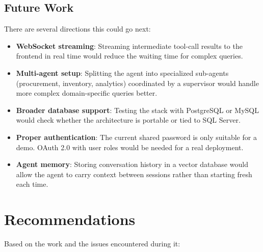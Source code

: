 \documentclass{book}
\begin{document}
\section{Future Work}

There are several directions this could go next:
\begin{itemize}[itemsep=0pt]
\item \textbf{WebSocket streaming}: Streaming intermediate tool-call results to the frontend in real time would reduce the waiting time for complex queries.
\item \textbf{Multi-agent setup}: Splitting the agent into specialized sub-agents (procurement, inventory, analytics) coordinated by a supervisor would handle more complex domain-specific queries better.
\item \textbf{Broader database support}: Testing the stack with PostgreSQL or MySQL would check whether the architecture is portable or tied to SQL Server.
\item \textbf{Proper authentication}: The current shared password is only suitable for a demo. OAuth 2.0 with user roles would be needed for a real deployment.
\item \textbf{Agent memory}: Storing conversation history in a vector database would allow the agent to carry context between sessions rather than starting fresh each time.
\end{itemize}


\chapter{Recommendations}

Based on the work and the issues encountered during it:
\end{document}
